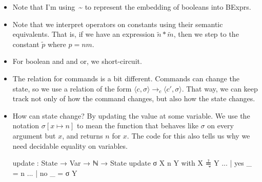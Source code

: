 \documentclass{lecturenotes}
\newcommand{\itrue}{\textsf{true}}
\newcommand{\ifalse}{\textsf{false}}
\newcommand{\astep}{\ensuremath{\mathrel{\longrightarrow_a}}}
\newcommand{\bstep}{\ensuremath{\mathrel{\longrightarrow_b}}}
\newcommand{\cstep}{\ensuremath{\mathrel{\longrightarrow_c}}}
\begin{document}
\begin{syntax}
    \alternative{\bullet}
\end{syntax}

\begin{itemize}
\item Note that I'm using~\textasciitilde{} to represent the embedding of booleans into \textsf{BExpr}s.
\item Note that we interpret operators on constants using their semantic equivalents.
  That is, if we have an expression $\tilde{n} \ast \tilde{m}$, then we step to the constant $\tilde{p}$ where $p = nm$.
\item For boolean and and or, we short-circuit.
\item The relation for commands is a bit different.
  Commands can change the state, so we use a relation of the form $\langle c, \sigma\rangle \cstep \langle c', \sigma\rangle$.
  That way, we can keep track not only of how the command changes, but also how the state changes.
\item How can state change?
  By updating the value at some variable.
  We use the notation $\sigma[x \mapsto n]$ to mean the function that behaves like $\sigma$ on every argument but $x$, and returns $n$ for $x$.
  The code for this also tells us why we need decidable equality on variables.
\begin{code}
update : State → Var → ℕ → State
update σ X n Y with X ≟̬ Y
... | yes _ = n
... | no _ = σ Y 
\end{code}
\end{itemize}
\end{document}
